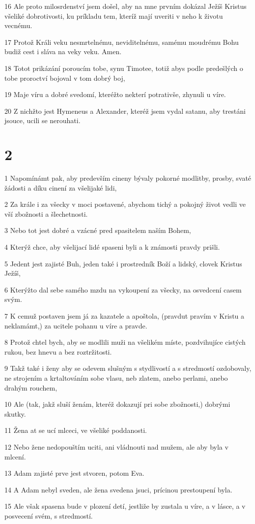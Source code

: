 \par 16 Ale proto milosrdenství jsem došel, aby na mne prvním dokázal Ježíš Kristus všeliké dobrotivosti, ku príkladu tem, kteríž mají uveriti v neho k životu vecnému.
\par 17 Protož Králi veku nesmrtelnému, neviditelnému, samému moudrému Bohu budiž cest i sláva na veky veku. Amen.
\par 18 Totot prikázání poroucím tobe, synu Timotee, totiž abys podle predešlých o tobe proroctví bojoval v tom dobrý boj,
\par 19 Maje víru a dobré svedomí, kteréžto nekterí potrativše, zhynuli u víre.
\par 20 Z nichžto jest Hymeneus a Alexander, kteréž jsem vydal satanu, aby trestáni jsouce, ucili se nerouhati.

\chapter{2}

\par 1 Napomínámt pak, aby predevším cineny bývaly pokorné modlitby, prosby, svaté žádosti a díku cinení za všelijaké lidi,
\par 2 Za krále i za všecky v moci postavené, abychom tichý a pokojný život vedli ve vší zbožnosti a šlechetnosti.
\par 3 Nebo tot jest dobré a vzácné pred spasitelem naším Bohem,
\par 4 Kterýž chce, aby všelijací lidé spaseni byli a k známosti pravdy prišli.
\par 5 Jedent jest zajisté Buh, jeden také i prostredník Boží a lidský, clovek Kristus Ježíš,
\par 6 Kterýžto dal sebe samého mzdu na vykoupení za všecky, na osvedcení casem svým.
\par 7 K cemuž postaven jsem já za kazatele a apoštola, (pravdut pravím v Kristu a neklamámt,) za ucitele pohanu u víre a pravde.
\par 8 Protož chtel bych, aby se modlili muži na všelikém míste, pozdvihujíce cistých rukou, bez hnevu a bez roztržitosti.
\par 9 Takž také i ženy aby se odevem slušným s stydlivostí a s stredmostí ozdobovaly, ne strojením a krtaltováním sobe vlasu, neb zlatem, anebo perlami, anebo drahým rouchem,
\par 10 Ale (tak, jakž sluší ženám, kteréž dokazují pri sobe zbožnosti,) dobrými skutky.
\par 11 Žena at se ucí mlceci, ve všeliké poddanosti.
\par 12 Nebo žene nedopouštím uciti, ani vládnouti nad mužem, ale aby byla v mlcení.
\par 13 Adam zajisté prve jest stvoren, potom Eva.
\par 14 A Adam nebyl sveden, ale žena svedena jsuci, prícinou prestoupení byla.
\par 15 Ale však spasena bude v plození detí, jestliže by zustala u víre, a v lásce, a v posvecení svém, s stredmostí.

